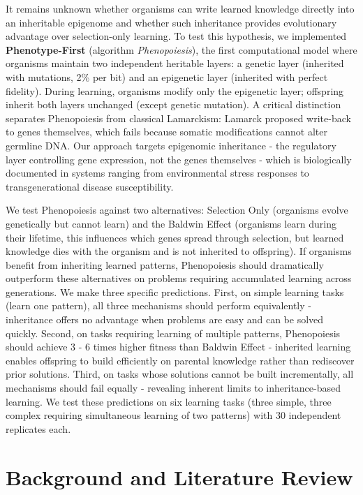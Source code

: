 \documentclass[11pt]{article}
\begin{document}
It remains unknown whether organisms can write learned knowledge directly into an inheritable epigenome and whether such inheritance provides evolutionary advantage over selection-only learning. To test this hypothesis, we implemented \textbf{Phenotype-First} (algorithm \textit{Phenopoiesis}), the first computational model where organisms maintain two independent heritable layers: a genetic layer (inherited with mutations, 2\% per bit) and an epigenetic layer (inherited with perfect fidelity). During learning, organisms modify only the epigenetic layer; offspring inherit both layers unchanged (except genetic mutation). A critical distinction separates Phenopoiesis from classical Lamarckism: Lamarck proposed write-back to genes themselves, which fails because somatic modifications cannot alter germline DNA. Our approach targets epigenomic inheritance - the regulatory layer controlling gene expression, not the genes themselves - which is biologically documented in systems ranging from environmental stress responses to transgenerational disease susceptibility.

We test Phenopoiesis against two alternatives: Selection Only (organisms evolve genetically but cannot learn) and the Baldwin Effect (organisms learn during their lifetime, this influences which genes spread through selection, but learned knowledge dies with the organism and is not inherited to offspring)\citep{Baldwin1896}. If organisms benefit from inheriting learned patterns, Phenopoiesis should dramatically outperform these alternatives on problems requiring accumulated learning across generations. We make three specific predictions. First, on simple learning tasks (learn one pattern), all three mechanisms should perform equivalently - inheritance offers no advantage when problems are easy and can be solved quickly. Second, on tasks requiring learning of multiple patterns, Phenopoiesis should achieve 3 - 6 times higher fitness than Baldwin Effect - inherited learning enables offspring to build efficiently on parental knowledge rather than rediscover prior solutions. Third, on tasks whose solutions cannot be built incrementally, all mechanisms should fail equally - revealing inherent limits to inheritance-based learning. We test these predictions on six learning tasks (three simple, three complex requiring simultaneous learning of two patterns) with 30 independent replicates each.

\section*{Background and Literature Review}
\end{document}
